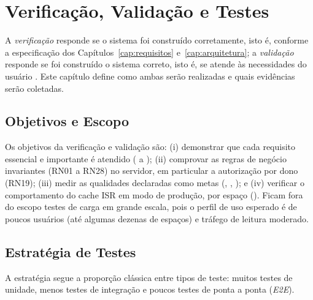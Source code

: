 \chapter{Verificação, Validação e Testes}\label{cap:testes}

A \emph{verificação} responde se o sistema foi construído corretamente, isto é, conforme a especificação dos Capítulos~\ref{cap:requisitos} e~\ref{cap:arquitetura}; a \emph{validação} responde se foi construído o sistema correto, isto é, se atende às necessidades do usuário \cite{sommerville2011,pressman2021}. Este capítulo define como ambas serão realizadas e quais evidências serão coletadas.

\section{Objetivos e Escopo}\label{sec:testes-objetivos}

Os objetivos da verificação e validação são: (i) demonstrar que cada requisito essencial e importante é atendido ( a ); (ii) comprovar as regras de negócio invariantes (RN01 a RN28) no servidor, em particular a autorização por dono (RN19); (iii) medir as qualidades declaradas como metas (, , ); e (iv) verificar o comportamento do cache ISR em modo de produção, por espaço (). Ficam fora do escopo testes de carga em grande escala, pois o perfil de uso esperado é de poucos usuários (até algumas dezenas de espaços) e tráfego de leitura moderado.

\section{Estratégia de Testes}\label{sec:testes-estrategia}

A estratégia segue a proporção clássica entre tipos de teste: muitos testes de unidade, menos testes de integração e poucos testes de ponta a ponta (\emph{E2E}).

